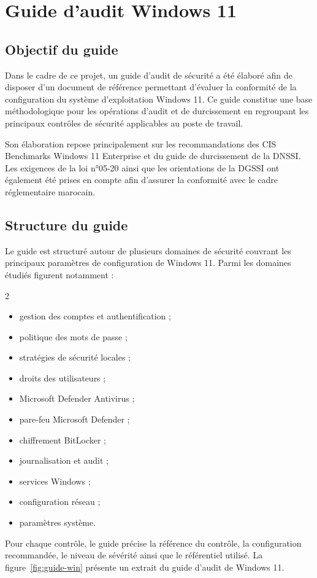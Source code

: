 \section{Guide d'audit Windows 11}

\subsection{Objectif du guide}

Dans le cadre de ce projet, un guide d'audit de sécurité a été élaboré afin de disposer d'un document de référence permettant d'évaluer la conformité de la configuration du système d'exploitation Windows 11. Ce guide constitue une base méthodologique pour les opérations d'audit et de durcissement en regroupant les principaux contrôles de sécurité applicables au poste de travail.

Son élaboration repose principalement sur les recommandations des CIS Benchmarks Windows 11 Enterprise et du guide de durcissement de la DNSSI. Les exigences de la loi n°05-20 ainsi que les orientations de la DGSSI ont également été prises en compte afin d'assurer la conformité avec le cadre réglementaire marocain.

\subsection{Structure du guide}

Le guide est structuré autour de plusieurs domaines de sécurité couvrant les principaux paramètres de configuration de Windows 11. Parmi les domaines étudiés figurent notamment :
\begin{multicols}{2}
\begin{itemize}
  \item gestion des comptes et authentification ;
  \item politique des mots de passe ;
  \item stratégies de sécurité locales ;
  \item droits des utilisateurs ;
  \item Microsoft Defender Antivirus ;
  \item pare-feu Microsoft Defender ;
  \item chiffrement BitLocker ;
  \item journalisation et audit ;
  \item services Windows ;
  \item configuration réseau ;
  \item paramètres système.
\end{itemize}
\end{multicols}
Pour chaque contrôle, le guide précise la référence du contrôle, la configuration recommandée, le niveau de sévérité ainsi que le référentiel utilisé. La figure~\ref{fig:guide-win} présente un extrait du guide d'audit de Windows 11.

